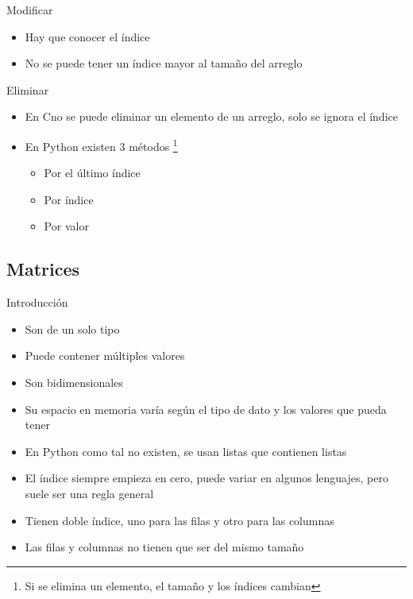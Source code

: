 \documentclass{beamer}
\newcommand{\Rplus}{\protect\hspace{-.1em}\protect\raisebox{.35ex}{\smaller{\smaller\textbf{+}}}}
\newcommand{\Cpp}{\mbox{C\Rplus\Rplus}\hspace{3pt}}
\begin{document}
\begin{frame}{Modificar}
	\begin{itemize}
		\item Hay que conocer el \'indice
		\item No se puede tener un \'indice mayor al tamaño del arreglo
	\end{itemize}
\end{frame}

\begin{frame}{Eliminar}
	\begin{itemize}
		\item En \Cpp no se puede eliminar un elemento de un arreglo, solo se ignora el \'indice 
		\item En Python existen 3 m\'etodos \footnote{Si se elimina un elemento, el tamaño y los \'indices cambian}
		\begin{itemize}
			\item Por el \'ultimo \'indice
			\item Por \'indice
			\item Por valor
		\end{itemize}
	\end{itemize}
\end{frame}

\subsection{Matrices}
\begin{frame}{Introducci\'on}
	\begin{itemize}
		\item Son de un solo tipo
		\item Puede contener m\'ultiples valores
		\item Son bidimensionales
		\item Su espacio en memoria var\'ia seg\'un el tipo de dato y los valores que pueda tener
		\item En Python como tal no existen, se usan listas que contienen listas
		\item El \'indice siempre empieza en cero, puede variar en algunos lenguajes, pero suele ser una regla general
		\item Tienen doble índice, uno para las filas y otro para las columnas
		\item Las filas y columnas no tienen que ser del mismo tamaño
	\end{itemize}
\end{frame}
\end{document}
